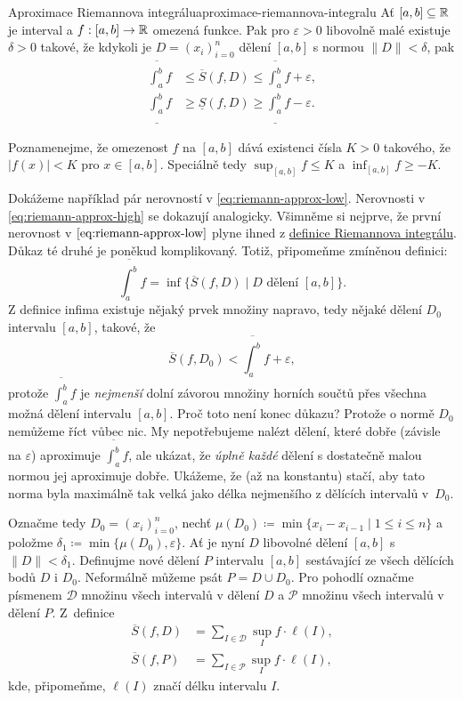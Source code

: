 \begin{theorem}{Aproximace Riemannova integrálu}{aproximace-riemannova-integralu}
 Ať $[a,b] \subseteq \mathbb{R}$ je interval a $f:[a,b] \to \mathbb{R}$ omezená funkce. Pak pro
 $\varepsilon>0$ libovolně malé existuje $\delta>0$ takové, že kdykoli je $D =
 (x_i)_{i=0}^{n}$ dělení $[a,b]$ s normou $\|D\|<\delta$, pak
 \begin{align}
  \overline{\int_{a}^{b}} f & \leq \overline{S}(f,D) \leq
  \overline{\int_{a}^{b}} f + \varepsilon, \label{eq:riemann-approx-low}\\
  \underline{\int_{a}^{b}} f & \geq \underline{S}(f,D) \geq
  \underline{\int_{a}^{b}} f - \varepsilon. \label{eq:riemann-approx-high}
 \end{align}
\end{theorem}
\begin{thmproof}
 Poznamenejme, že omezenost $f$ na $[a,b]$ dává existenci čísla $K>0$ takového,
 že $|f(x)| < K$ pro $x \in [a,b]$. Speciálně tedy $\sup_{[a,b]} f \leq K$ a
 $\inf_{[a,b]} f \geq -K$.

 Dokážeme například pár nerovností v \eqref{eq:riemann-approx-low}. Nerovnosti v
 \eqref{eq:riemann-approx-high} se dokazují analogicky. Všimněme si nejprve, že
 první nerovnost v $\eqref{eq:riemann-approx-low}$ plyne ihned z
 \hyperref[def:riemannuv-integral]{definice Riemannova integrálu}. Důkaz té
 druhé je poněkud komplikovaný. Totiž, připomeňme zmíněnou definici:
 \[
  \overline{\int_{a}^{b}} f = \inf \{\overline{S}(f,D) \mid D \text{ dělení }
  [a,b]\}.
 \]
 Z definice infima existuje nějaký prvek množiny napravo, tedy nějaké dělení
 $D_0$ intervalu $[a,b]$, takové, že
 \[
  \overline{S}(f,D_0) < \overline{\int_{a}^{b}} f + \varepsilon,
 \]
 protože $\overline{\int_{a}^{b}} f$ je \emph{nejmenší} dolní závorou množiny
 horních součtů přes všechna možná dělení intervalu $[a,b]$. Proč toto není
 konec důkazu? Protože o normě $D_0$ nemůžeme říct vůbec nic. My nepotřebujeme
 nalézt dělení, které dobře (závisle na $\varepsilon$) aproximuje
 $\overline{\int_{a}^{b}} f$, ale ukázat, že \emph{úplně každé} dělení s
 dostatečně malou normou jej aproximuje dobře. Ukážeme, že (až na konstantu)
 stačí, aby tato norma byla maximálně tak velká jako délka nejmenšího z dělících
 intervalů v~$D_0$.

 Označme tedy $D_0 = (x_i)_{i=0}^{n}$, nechť $\mu(D_0) \coloneqq \min \{x_i -
 x_{i-1} \mid 1 \leq i \leq n\}$ a položme $\delta_1 \coloneqq \min
 \{\mu(D_0),\varepsilon\}$. Ať je nyní $D$ libovolné dělení $[a,b]$ s
 $\|D\|<\delta_1$. Definujme nové dělení $P$ intervalu $[a,b]$ sestávající ze
 všech dělících bodů $D$ i $D_0$. Neformálně můžeme psát $P = D \cup D_0$. Pro
 pohodlí označme písmenem $\mathcal{D}$ množinu všech intervalů v dělení $D$ a
 $\mathcal{P}$ množinu všech intervalů v dělení $P$. Z~definice
 \begin{align*}
  \overline{S}(f,D) &= \sum_{I \in \mathcal{D}} \sup_I f \cdot \ell(I),\\
  \overline{S}(f,P) &= \sum_{I \in \mathcal{P}} \sup_I f \cdot \ell(I),
 \end{align*}
 kde, připomeňme, $\ell(I)$ značí délku intervalu $I$.


\end{thmproof}
